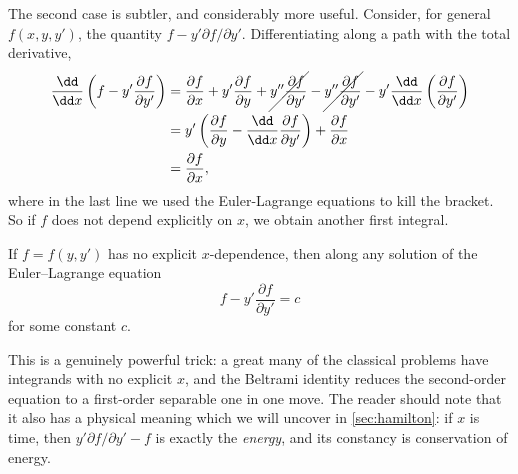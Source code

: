 \documentclass[a4paper]{scrartcl}
\begin{document}
The second case is subtler, and considerably more useful. Consider, for general $f(x, y, y')$, the quantity $f - y' \partial f/\partial y'$. Differentiating along a path with the total derivative,
\begin{align*}
	\frac{\dd}{\dd x} \left(f - y' \frac{\partial f}{\partial y'}\right) &= \frac{\partial f}{\partial x} + y' \frac{\partial f}{\partial y} + \cancel{y'' \frac{\partial f}{\partial y'}} -\cancel{ y'' \frac{\partial f}{\partial y'}} - y' \frac{\dd}{\dd x}\left(\frac{\partial f}{\partial y'}\right) \\
	&= y' \left(\frac{\partial f}{\partial y} - \frac{\dd}{\dd x} \frac{\partial f}{\partial y'}\right) + \frac{\partial f}{\partial x} \\
	&= \frac{\partial f}{\partial x},
\end{align*}
where in the last line we used the Euler-Lagrange equations to kill the bracket. So if $f$ does not depend explicitly on $x$, we obtain another first integral.

\begin{proposition}\label{prop:beltrami}
	If $f = f(y, y')$ has no explicit $x$-dependence, then along any solution of the Euler--Lagrange equation
	$$
	f - y' \frac{\partial f}{\partial y'} = c
	$$
	for some constant $c$.
\end{proposition}

This is a genuinely powerful trick: a great many of the classical problems have integrands with no explicit $x$, and the Beltrami identity reduces the second-order equation to a first-order separable one in one move. The reader should note that it also has a physical meaning which we will uncover in \autoref{sec:hamilton}: if $x$ is time, then $y'\partial f/\partial y' - f$ is exactly the \emph{energy}, and its constancy is conservation of energy.
\end{document}

